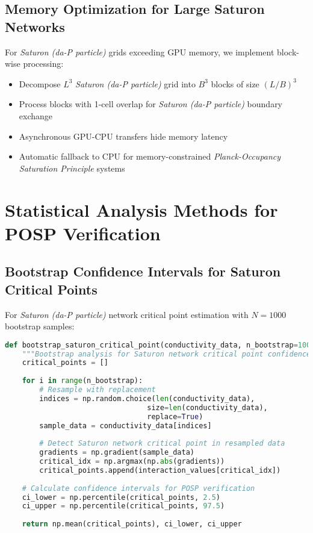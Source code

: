 \documentclass[twocolumn,showpacs,preprintnumbers,amsmath,amssymb,prb]{revtex4-2}
\newcommand{\saturon}{\textit{Saturon (da-P particle)}}
\newcommand{\posp}{\textit{Planck-Occupancy Saturation Principle}}
\begin{document}
\subsection{Memory Optimization for Large Saturon Networks}

For \saturon{} grids exceeding GPU memory, we implement block-wise processing:
\begin{itemize}
\item Decompose $L^3$ \saturon{} grid into $B^3$ blocks of size $(L/B)^3$
\item Process blocks with 1-cell overlap for \saturon{} boundary exchange
\item Asynchronous GPU-CPU transfers hide memory latency
\item Automatic fallback to CPU for memory-constrained \posp{} systems
\end{itemize}

\section{Statistical Analysis Methods for POSP Verification}
\label{app:statistics}

\subsection{Bootstrap Confidence Intervals for Saturon Critical Points}

For \saturon{} network critical point estimation with $N=1000$ bootstrap samples:

\begin{lstlisting}[language=Python, caption=Bootstrap analysis for Saturon critical point detection]
def bootstrap_saturon_critical_point(conductivity_data, n_bootstrap=1000):
    """Bootstrap analysis for Saturon network critical point confidence intervals"""
    critical_points = []
    
    for i in range(n_bootstrap):
        # Resample with replacement
        indices = np.random.choice(len(conductivity_data), 
                                 size=len(conductivity_data), 
                                 replace=True)
        sample_data = conductivity_data[indices]
        
        # Detect Saturon network critical point in resampled data
        gradients = np.gradient(sample_data)
        critical_idx = np.argmax(np.abs(gradients))
        critical_points.append(interaction_values[critical_idx])
    
    # Calculate confidence intervals for POSP verification
    ci_lower = np.percentile(critical_points, 2.5)
    ci_upper = np.percentile(critical_points, 97.5)
    
    return np.mean(critical_points), ci_lower, ci_upper
\end{lstlisting}
\end{document}

